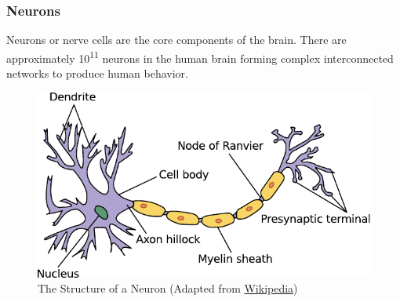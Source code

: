 \documentclass[12pt]{article}
\newcommand\mysubsubsection[1]{\subsubsection{#1}}
\numberwithin{equation}{section}
\numberwithin{figure}{section}
\numberwithin{table}{section}
\begin{document}
\mysubsubsection{Neurons}

\par{
    Neurons or nerve cells are the core components of the brain. There are
    approximately 10\textsuperscript{11} neurons in the human brain \citep{kandel_principles_2013}
    forming complex interconnected networks to produce human behavior.

\begin{figure}[ht]
    \centering
    \includegraphics[scale=0.9]{images/neuron}
    \caption[The Structure of a Neuron]{The Structure of a Neuron (Adapted from \href{http://commons.wikimedia.org/wiki/File:Neuron.svg}{Wikipedia})}
    \label{fig:neuron}
\end{figure}
}
\end{document}

